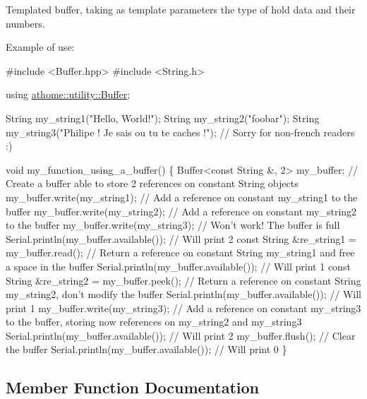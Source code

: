Templated buffer, taking as template parameters the type of hold data and their numbers.

Example of use\+:


\begin{DoxyCode}
\textcolor{preprocessor}{#include <Buffer.hpp>}
\textcolor{preprocessor}{#include <String.h>}

\textcolor{keyword}{using} \mbox{\hyperlink{classathome_1_1utility_1_1_buffer}{athome::utility::Buffer}};

String my\_string1(\textcolor{stringliteral}{"Hello, World!"});
String my\_string2(\textcolor{stringliteral}{"foobar"});
String my\_string3(\textcolor{stringliteral}{"Philipe ! Je sais ou tu te caches !"}); \textcolor{comment}{// Sorry for}
non-french readers :)

\textcolor{keywordtype}{void} my\_function\_using\_a\_buffer() \{
  Buffer<const String &, 2> my\_buffer; \textcolor{comment}{// Create a buffer able to store 2}
references on constant String objects my\_buffer.write(my\_string1); \textcolor{comment}{// Add a}
reference on constant my\_string1 to the buffer my\_buffer.write(my\_string2);
\textcolor{comment}{// Add a reference on constant my\_string2 to the buffer}
  my\_buffer.write(my\_string3); \textcolor{comment}{// Won't work! The buffer is full}
  Serial.println(my\_buffer.available()); \textcolor{comment}{// Will print 2}
  \textcolor{keyword}{const} String &re\_string1 = my\_buffer.read(); \textcolor{comment}{// Return a reference on}
constant String my\_string1 and free a space in the buffer
  Serial.println(my\_buffer.available()); \textcolor{comment}{// Will print 1}
  \textcolor{keyword}{const} String &re\_string2 = my\_buffer.peek(); \textcolor{comment}{// Return a reference on}
constant String my\_string2, don\textcolor{stringliteral}{'t modify the buffer}
\textcolor{stringliteral}{  Serial.println(my\_buffer.available()); // Will print 1}
\textcolor{stringliteral}{  my\_buffer.write(my\_string3); // Add a reference on constant my\_string3 to}
\textcolor{stringliteral}{the buffer, storing now references on my\_string2 and my\_string3}
\textcolor{stringliteral}{  Serial.println(my\_buffer.available()); // Will print 2}
\textcolor{stringliteral}{  my\_buffer.flush(); // Clear the buffer}
\textcolor{stringliteral}{  Serial.println(my\_buffer.available()); // Will print 0}
\textcolor{stringliteral}{\}}
\end{DoxyCode}
 

\subsection{Member Function Documentation}
\mbox{\label{classathome_1_1utility_1_1_buffer_a2c441e74e8e325e8eb6cfb7ffb04b157}} 
